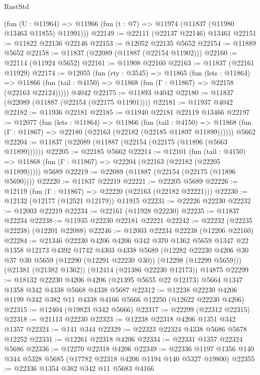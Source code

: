 \begin{lexlean}{RustStd}
\begin{coremodule}
    (fun (U : @11964) => @11966 (fun (t : @7) => @11974 (@11837 (@11980 @13463 @11855) @11991)))
@22149 := @22111 (@22137 @22146) @13461
@22151 := @11822 @22136 @22146
@22153 := @12052 @22135 @5652
@22154 := @11889 @5652
@22158 := @11837 (@22089 (@11887 (@22154 @11902)))
@22160 := @22114 (@11924 @5652)
@22161 := @11908 @22160
@22163 := @11837 (@22161 @11929)
@22174 := @12055
    (fun (rty : @3545) =>
    @11865
      (fun (lets : @11864) =>
      @11866 (fun (tail : @4150) => @11868 (fun (Γ : @11867) => @22158 (@22163 @22124)))))
    @4042
@22175 := @11893 @4042
@22180 := @11837 (@22089 (@11887 (@22154 (@22175 @11901))))
@22181 := @11937 @4042
@22182 := @11936 @22181
@22185 := @11940 @22181 @22119 @13466
@22197 := @12077
    (fun (lets : @11864) =>
    @11866
      (fun (tail : @4150) =>
      @11868 (fun (Γ : @11867) => @22180 (@22163 (@22182 (@22185 @11897 @11899))))))
    @5662
@22204 := @11837 (@22089 (@11887 (@22154 (@22175 (@11896 (@5663 @11899))))))
@22205 := @22185 @5662
@22214 := @12101
    (fun (tail : @4150) => @11868 (fun (Γ : @11867) => @22204 (@22163 (@22182 (@22205 @11899)))))
    @5689
@22219 := @22089 (@11887 (@22154 (@22175 (@11896 @5690))))
@22220 := @11837 @22219
@22221 := @22205 @5689
@22226 := @12119 (fun (Γ : @11867) => @22220 (@22163 (@22182 @22221)))
@22230 := @12132 (@12177 (@12521 @12179)) @11915
@22231 := @22226 @22230
@22232 := @12003 @22219
@22234 := @22161 (@11928 @22230)
@22235 := @11837 @22234
@22238 := @11935 @22230 @22181 @22221
@22242 := @22232 (@22235 @22238) (@12201 @22088)
@22246 := @12003 @22234 @22238 (@12206 @22160)
@22284 := @21346
    @22230
    @4206
    @4206
    @342
    @370
    @1362
    @5659
    @1347
    @22
    @1358
    @12173
    @4392
    @1742
    @4303
    @4338
    @5689
    (@12282 @22230 @4206 @30 @37 @30 @5659 (@12290 (@12291 @22230 @30)) (@12298 (@12299 @5659)))
    (@21381 (@21382 @1362))
    (@12414 (@21386 @22230 @12173))
    @14875
@22299 := @18132
    @22230
    @4206
    @4206
    (@21395 @5655 @22 @12173)
    @5664
    @1347
    @1358
    @342
    @4338
    @5668
    @4338
    @5687
@22312 := @12238 @22230 @4206 @1199 @342 @382 @11 @4338 @4166 @5666 @12250 (@12622 @22230 @4206)
@22315 := @12404 (@19823 @342 @5666)
@22317 := @22299 (@22312 @22315)
@22318 := @21113 @22230
@22323 := @12238 @22318 @4206 @1351 @342 @1357
@22324 := @141 @344
@22329 := @22323 @22324 @4338 @5686 @5678 @12252
@22331 := @12261 @22318 @4206
@22334 := @22331 @1357 @22324 @5686
@22336 := @12270 @22318 @4206
@22349 := @22336 @1197 @1356 @140 @344 @5328 @5685 (@17782 @22318 @4206 @1194 @140 @5327 @19800)
@22355 := @22336 @1354 @382 @342 @11 @5683 @4166

\end{coremodule}
\end{lexlean}
